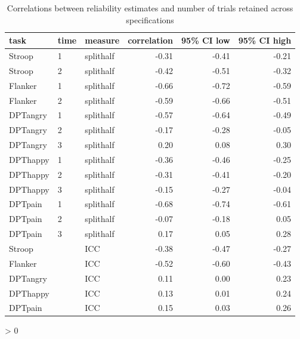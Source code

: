 \documentclass[
  english,
  man,floatsintext]{apa6}
\newlength{\cslhangindent}
\newenvironment{CSLReferences}[2] %
 {%
  \setlength{\parindent}{0pt}
  \ifodd #1 \everypar{\setlength{\hangindent}{\cslhangindent}}\ignorespaces\fi
  \ifnum #2 > 0
  \setlength{\parskip}{#2\baselineskip}
  \fi
 }%
 {}
\begin{document}
\begin{table}[tbp]

\begin{center}
\begin{threeparttable}

\caption{\label{tab:tableone}Correlations between reliability estimates and number of trials retained across specifications}

\begin{tabular}{lllrrr}
\toprule
task & \multicolumn{1}{c}{time} & \multicolumn{1}{c}{measure} & \multicolumn{1}{c}{correlation} & \multicolumn{1}{c}{95\% CI low} & \multicolumn{1}{c}{95\% CI high}\\
\midrule
Stroop & 1 & splithalf & -0.31 & -0.41 & -0.21\\
Stroop & 2 & splithalf & -0.42 & -0.51 & -0.32\\
Flanker & 1 & splithalf & -0.66 & -0.72 & -0.59\\
Flanker & 2 & splithalf & -0.59 & -0.66 & -0.51\\
DPTangry & 1 & splithalf & -0.57 & -0.64 & -0.49\\
DPTangry & 2 & splithalf & -0.17 & -0.28 & -0.05\\
DPTangry & 3 & splithalf & 0.20 & 0.08 & 0.30\\
DPThappy & 1 & splithalf & -0.36 & -0.46 & -0.25\\
DPThappy & 2 & splithalf & -0.31 & -0.41 & -0.20\\
DPThappy & 3 & splithalf & -0.15 & -0.27 & -0.04\\
DPTpain & 1 & splithalf & -0.68 & -0.74 & -0.61\\
DPTpain & 2 & splithalf & -0.07 & -0.18 & 0.05\\
DPTpain & 3 & splithalf & 0.17 & 0.05 & 0.28\\
Stroop &  & ICC & -0.38 & -0.47 & -0.27\\
Flanker &  & ICC & -0.52 & -0.60 & -0.43\\
DPTangry &  & ICC & 0.11 & 0.00 & 0.23\\
DPThappy &  & ICC & 0.13 & 0.01 & 0.24\\
DPTpain &  & ICC & 0.15 & 0.03 & 0.26\\
\bottomrule
\end{tabular}

\end{threeparttable}
\end{center}

\end{table}

\newpage

\begingroup
\setlength{\parindent}{-0.5in}
\setlength{\leftskip}{0.5in}

\hypertarget{refs}{}
\begin{CSLReferences}{0}{0}
\end{CSLReferences}

\endgroup
\end{document}

